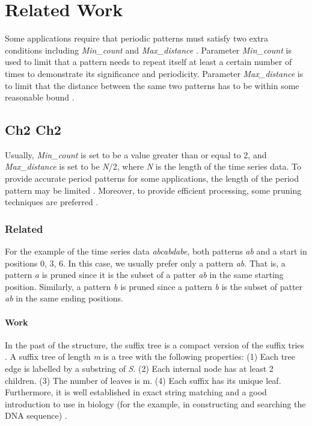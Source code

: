 %
%
%
\chapter{Related Work}
\vspace*{30pt} Some applications require that periodic patterns must
satisfy two extra conditions including \emph{Min\_count} and
\emph{Max\_distance} \cite{Anwar2015}. Parameter \emph{Min\_count}
is used to limit that a pattern needs to repeat itself at least a
certain number of times to demonstrate its significance and
periodicity. Parameter \emph{Max\_distance} is to limit that the
distance between the same two patterns has to be within some
reasonable bound \cite{AA2004, Patnaik2008, Coan2003}.

\section{Ch2 Ch2}
Usually, \emph{Min\_count} is set to be a value greater than or
equal to 2, and \emph{Max\_distance} is set to be \emph{N}/2, where
\emph{N} is the length of the time series data. To provide accurate
period patterns for some applications, the length of the period
pattern may be limited \cite{Pippa2016}. Moreover, to provide
efficient processing, some pruning techniques are preferred
\cite{Patnaik2008}.

\subsection{Related}
For the example of the time series data \emph{abcabdabe}, both
patterns \emph{ab} and a start in positions 0, 3, 6. In this case,
we usually prefer only a pattern \emph{ab}. That is, a pattern
\emph{a} is pruned since it is the subset of a patter \emph{ab} in
the same starting position. Similarly, a pattern \emph{b} is pruned
since a pattern \emph{b} is the subset of patter \emph{ab} in the
same ending positions.

\subsubsection{Work}
In the past of the structure, the suffix tree is a compact version
of the suffix tries \cite{Pablo2006}. A suffix tree of length
\emph{m} is a tree with the following properties: (1) Each tree edge
is labelled by a substring of \emph{S}. (2) Each internal node has
at least 2 children. (3) The number of leaves is m. (4) Each suffix
has its unique leaf. Furthermore, it is well established in exact
string matching and a good introduction to use in biology (for the
example, in constructing and searching the DNA sequence)
\cite{Patnaik2008}.

